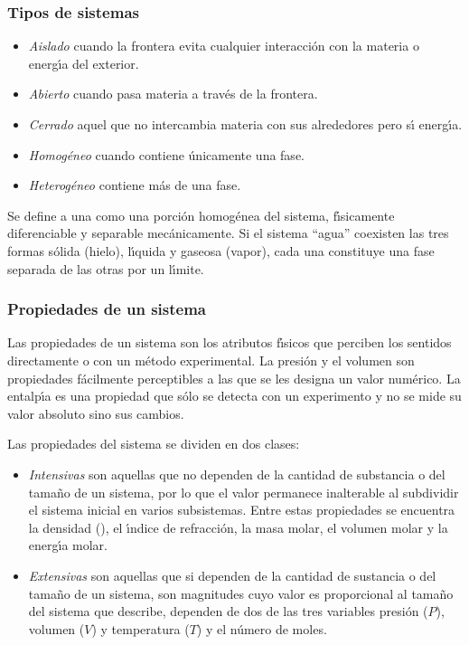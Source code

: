 \subsubsection{Tipos de sistemas}

\begin{itemize}
\item \textit{Aislado} cuando la frontera evita cualquier interacci\'on con la materia o  energ\'{\i}a del exterior.
\item \textit{Abierto} cuando pasa materia a trav\'es de la frontera.
\item \textit{Cerrado} aquel que no intercambia materia con sus alrededores pero s\'{\i} ener\-g\'{\i}a.
\item \textit{Homog\'eneo} cuando contiene \'unicamente una fase.
\item \textit{Heterog\'eneo} contiene m\'as de una fase.
\end{itemize}

Se define a una  como una porci\'on homog\'enea del sistema, f\'{\i}sica\-mente diferenciable y separable mec\'anicamente. Si el sistema ``agua'' coexisten las tres formas s\'olida (hielo), l\'{\i}quida y gaseosa (vapor), cada una constituye una fase separada de las otras por un l\'{\i}mite.


\subsubsection{Propiedades de un sistema}
Las propiedades de un sistema son los atributos f\'{\i}sicos que perciben los sentidos directamente o con un m\'etodo experimental. La presi\'on y el vo\-lumen son propiedades f\'acilmente perceptibles a las que se les designa un valor num\'erico. La entalp\'{\i}a es una propiedad que s\'olo se detecta con un experimento y no se mide su valor absoluto sino sus cambios.

Las propiedades del sistema se dividen en dos clases:

\begin{itemize}
\item \textit{Intensivas}  son aquellas que no dependen de la cantidad de substancia o del tama\~no de un sistema, por lo que el valor permanece inalterable al subdividir el sistema inicial en varios subsistemas. Entre estas propiedades se encuentra la densidad (), el \'{\i}ndice de refracci\'on, la masa molar, el volumen molar y la e\-nerg\'{\i}a molar. 
\item \textit{Extensivas} son aquellas que si dependen de la cantidad de sustancia o del tama\~no de un sistema, son magnitudes cuyo valor es proporcional al tama\~no del sistema que describe, dependen de dos de las tres variables presi\'on ($P$), volumen ($V$) y temperatura ($T$) y el n\'umero de moles.
\end{itemize}

